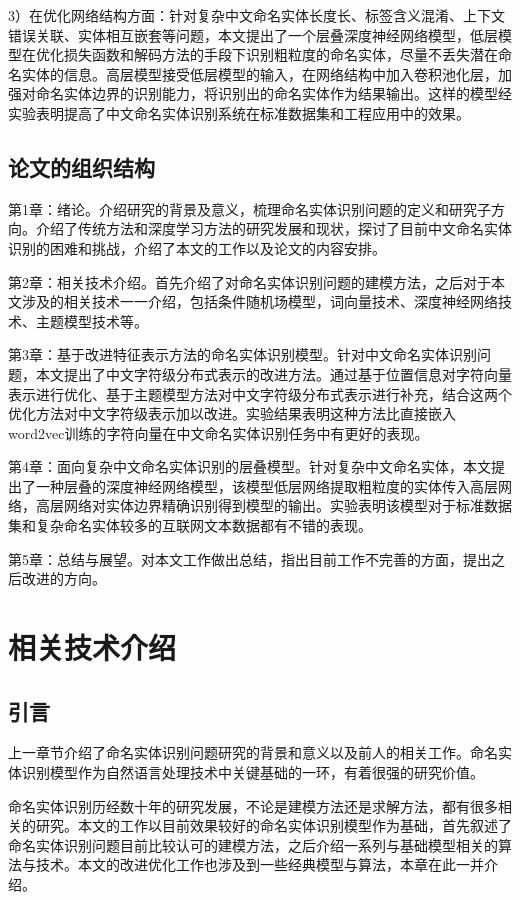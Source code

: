 \documentclass[winfonts,master,oneside,nobackinfo]{njuthesis}
\begin{document}
3）在优化网络结构方面：针对复杂中文命名实体长度长、标签含义混淆、上下文错误关联、实体相互嵌套等问题，本文提出了一个层叠深度神经网络模型，低层模型在优化损失函数和解码方法的手段下识别粗粒度的命名实体，尽量不丢失潜在命名实体的信息。高层模型接受低层模型的输入，在网络结构中加入卷积池化层，加强对命名实体边界的识别能力，将识别出的命名实体作为结果输出。这样的模型经实验表明提高了中文命名实体识别系统在标准数据集和工程应用中的效果。

\section{论文的组织结构}
第1章：绪论。介绍研究的背景及意义，梳理命名实体识别问题的定义和研究子方向。介绍了传统方法和深度学习方法的研究发展和现状，探讨了目前中文命名实体识别的困难和挑战，介绍了本文的工作以及论文的内容安排。

第2章：相关技术介绍。首先介绍了对命名实体识别问题的建模方法，之后对于本文涉及的相关技术一一介绍，包括条件随机场模型，词向量技术、深度神经网络技术、主题模型技术等。

第3章：基于改进特征表示方法的命名实体识别模型。针对中文命名实体识别问题，本文提出了中文字符级分布式表示的改进方法。通过基于位置信息对字符向量表示进行优化、基于主题模型方法对中文字符级分布式表示进行补充，结合这两个优化方法对中文字符级表示加以改进。实验结果表明这种方法比直接嵌入word2vec训练的字符向量在中文命名实体识别任务中有更好的表现。

第4章：面向复杂中文命名实体识别的层叠模型。针对复杂中文命名实体，本文提出了一种层叠的深度神经网络模型，该模型低层网络提取粗粒度的实体传入高层网络，高层网络对实体边界精确识别得到模型的输出。实验表明该模型对于标准数据集和复杂命名实体较多的互联网文本数据都有不错的表现。

第5章：总结与展望。对本文工作做出总结，指出目前工作不完善的方面，提出之后改进的方向。

\chapter{相关技术介绍}

\section{引言}
上一章节介绍了命名实体识别问题研究的背景和意义以及前人的相关工作。命名实体识别模型作为自然语言处理技术中关键基础的一环，有着很强的研究价值。

命名实体识别历经数十年的研究发展，不论是建模方法还是求解方法，都有很多相关的研究。本文的工作以目前效果较好的命名实体识别模型作为基础，首先叙述了命名实体识别问题目前比较认可的建模方法，之后介绍一系列与基础模型相关的算法与技术。本文的改进优化工作也涉及到一些经典模型与算法，本章在此一并介绍。
\end{document}
